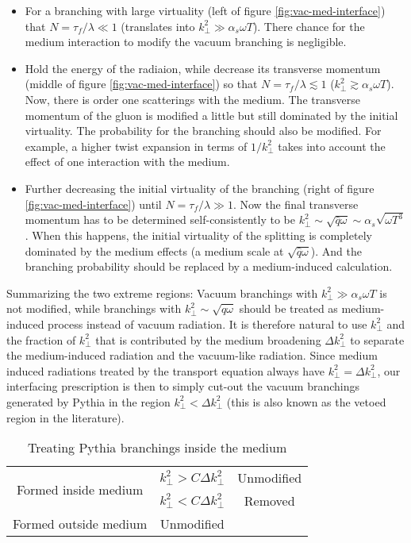 \begin{itemize}
\item For a branching with large virtuality (left of figure \ref{fig:vac-med-interface}) that $N = \tau_f/\lambda \ll 1$ (translates into $k_\perp^2 \gg \alpha_s  \omega T$). 
There chance for the medium interaction to modify the vacuum branching is negligible.
\item Hold the energy of the radiaion, while decrease its transverse momentum (middle of figure \ref{fig:vac-med-interface}) so that $N = \tau_f/\lambda \lesssim 1$ ($k_\perp^2 \gtrsim \alpha_s  \omega T$). 
Now, there is order one scatterings with the medium. 
The transverse momentum of the gluon is modified a little but still dominated by the initial virtuality.
The probability for the branching should also be modified.
For example, a higher twist expansion in terms of $1/k_\perp^2$ takes into account the effect of one interaction with the medium.
\item Further decreasing the initial virtuality of the branching (right of figure \ref{fig:vac-med-interface}) until $N = \tau_f/\lambda \gg 1$.
Now the final transverse momentum has to be determined self-consistently to be $k_\perp^2 \sim \sqrt{\hat{q}\omega} \sim \alpha_s\sqrt{\omega T^3}$. 
When this happens, the initial virtuality of the splitting is completely dominated by the medium effects (a medium scale at $\sqrt{\hat{q}\omega}$). 
And the branching probability should be replaced by a medium-induced calculation.
\end{itemize}
Summarizing the two extreme regions:
Vacuum branchings with $k_\perp^2 \gg \alpha_s \omega T$ is not modified, while branchings with $k_\perp^2 \sim \sqrt{\hat{q}\omega}$ should be treated as medium-induced process instead of vacuum radiation.
It is therefore natural to use $k_\perp^2$ and the fraction of $k_\perp^2$ that is contributed by the medium broadening $\Delta k_\perp^2$ to separate the medium-induced radiation and the vacuum-like radiation.
Since medium induced radiations treated by the transport equation always have $k_\perp^2 = \Delta k_\perp^2$,  our interfacing prescription is then to simply cut-out the vacuum branchings generated by Pythia in the region $k_\perp^2 <  \Delta k_\perp^2$ (this is also known as the vetoed region in the literature).

\begin{table}[h]
\centering
\caption{Treating Pythia branchings inside the medium}
\begin{tabular}{ccc}
\hline
\multirow{2}{*}{Formed inside medium} & $k_\perp^2 > C \Delta k_\perp^2$ & Unmodified\\
 & $k_\perp^2 < C \Delta k_\perp^2$ & Removed\\
Formed outside medium & Unmodified & \\
\hline
\end{tabular}
\label{tab:med-vac}
\end{table}

